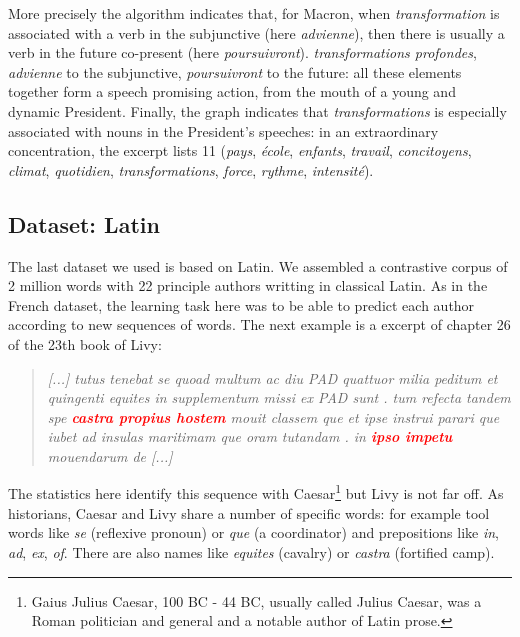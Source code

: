 More precisely the algorithm indicates that, for Macron, when \textit{transformation} is associated with a verb in the subjunctive (here \textit{advienne}), then there is usually a verb in the future co-present (here \textit{poursuivront}). \textit{transformations profondes}, \textit{advienne} to the subjunctive, \textit{poursuivront} to the future: all these elements together form a speech promising action, from the mouth of a young and dynamic President. Finally, the graph indicates that \textit{transformations} is especially associated with nouns in the President's speeches: in an extraordinary concentration, the excerpt lists 11 (\textit{pays}, \textit{école}, \textit{enfants}, \textit{travail}, \textit{concitoyens}, \textit{climat}, \textit{quotidien}, \textit{transformations}, \textit{force}, \textit{rythme}, \textit{intensité}).

\subsection{Dataset: Latin}
\label{subsec:dataset:lt}

The last dataset we used is based on Latin. We assembled a contrastive corpus of 2 million words with 22 principle authors writting in classical Latin. As in the French dataset, the learning task here was to be able to predict each author according to new sequences of words. The next example is a excerpt of chapter 26 of the 23th book of Livy:

\begin{quote}
\textit{[...] tutus tenebat se quoad multum ac diu PAD quattuor milia peditum et quingenti equites in supplementum missi ex PAD sunt . tum refecta tandem spe \textcolor{red}{\textbf{castra propius hostem}} mouit classem que et ipse instrui parari que iubet ad insulas maritimam que oram tutandam . in \textcolor{red}{\textbf{ipso impetu}} mouendarum de [...]} 
\end{quote}

The statistics here identify this sequence with Caesar\footnote{Gaius Julius Caesar, 100 BC - 44 BC, usually called Julius Caesar, was a Roman politician and general and a notable author of Latin prose.} but Livy is not far off. As historians, Caesar and Livy share a number of specific words: for example tool words like \textit{se} (reflexive pronoun) or \textit{que} (a coordinator) and prepositions like \textit{in}, \textit{ad}, \textit{ex}, \textit{of}. There are also names like \textit{equites} (cavalry) or \textit{castra} (fortified camp).


